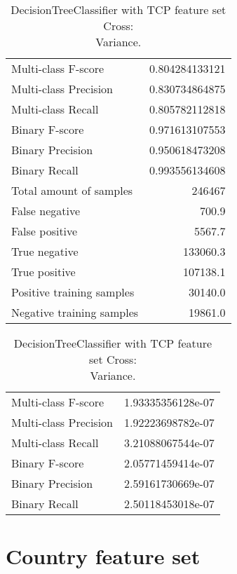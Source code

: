 \begin{table}[H]
\begin{minipage}{0.5\textwidth}
\caption{DecisionTreeClassifier with TCP feature set Cross: \\Average.}
\centering
\begin{tabular}{l r}
\toprule
Multi-class F-score & 0.804284133121 \\
Multi-class Precision & 0.830734864875 \\
Multi-class Recall & 0.805782112818 \\
\midrule
Binary F-score & 0.971613107553 \\
Binary Precision & 0.950618473208 \\
Binary Recall & 0.993556134608 \\
\midrule
Total amount of samples & 246467 \\
False negative & 700.9 \\
False positive & 5567.7 \\
True negative & 133060.3 \\
True positive & 107138.1 \\
\midrule
Positive training samples & 30140.0 \\
Negative training samples & 19861.0 \\
\bottomrule
\end{tabular}
\end{minipage}
\hfillx
\begin{minipage}{0.5\textwidth}
\caption{DecisionTreeClassifier with TCP feature set Cross: \\Variance.}
\centering
\begin{tabular}{l r}
\toprule
Multi-class F-score & 1.93335356128e-07 \\
Multi-class Precision & 1.92223698782e-07 \\
Multi-class Recall & 3.21088067544e-07 \\
\midrule
Binary F-score & 2.05771459414e-07 \\
Binary Precision & 2.59161730669e-07 \\
Binary Recall & 2.50118453018e-07 \\
\bottomrule
\end{tabular}
\end{minipage}
\end{table}


\newpage
\section{Country feature set}
